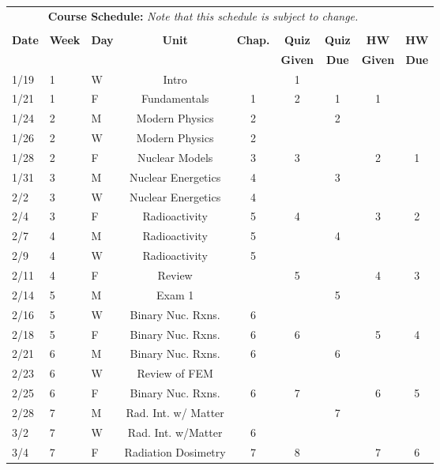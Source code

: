 \documentclass[11pt, a4paper]{article}
\begin{document}
\pagebreak
\FloatBarrier
\renewcommand{\arraystretch}{1}
\begin{table}[h]
\begin{center}
\begin{tabular}{lllcccccc}
\multicolumn{8}{c}{\textbf{Course Schedule:}\textit{ Note that this schedule is
subject to change.}}\\
&&&&&&&&\\
\textbf{Date} & \textbf{Week} & \textbf{Day} & \textbf{Unit} & \textbf{Chap.} & \textbf{Quiz}& \textbf{Quiz} & \textbf{HW} & \textbf{HW}\\
              &  &  &  &  & \textbf{Given} & \textbf{Due} & \textbf{Given} & \textbf{Due}\\ \hline
\hline
1/19 & 1 & W & Intro              &  & 1 &  &  & \\
1/21 & 1 & F & Fundamentals       & 1 & 2 & 1 & 1 &  \\
1/24 & 2 & M & Modern Physics     & 2 &   & 2 & &  \\
1/26 & 2 & W & Modern Physics     & 2 &   &  &  &  \\
1/28 & 2 & F & Nuclear Models     & 3 & 3 &  & 2 & 1  \\
1/31 & 3 & M & Nuclear Energetics & 4 &   & 3 & &  \\
2/2 & 3 & W & Nuclear Energetics  & 4 &   &  &  &  \\
2/4 & 3 & F & Radioactivity       & 5 & 4 &  & 3 & 2 \\
2/7 & 4 & M & Radioactivity       & 5 &   & 4 &  &  \\
2/9 & 4 & W & Radioactivity       & 5 &   &  &  &  \\
2/11 & 4 & F & Review             &   & 5 &  & 4 & 3 \\
2/14 & 5 & M & Exam 1             &   &   & 5  &  &  \\
2/16 & 5 & W & Binary Nuc. Rxns.  & 6 &   &  &  &  \\
2/18 & 5 & F & Binary Nuc. Rxns.  & 6 & 6 &  & 5 & 4 \\
2/21 & 6 & M & Binary Nuc. Rxns.  & 6 &   & 6 &  &  \\
2/23 & 6 & W & Review of FEM      &  &  &  &  &  \\
2/25 & 6 & F & Binary Nuc. Rxns.  & 6 & 7 &  & 6 & 5  \\
2/28 & 7 & M & Rad. Int. w/ Matter &  &  & 7 &  &  \\
3/2 & 7 & W & Rad. Int. w/Matter  & 6 &  &  &  &  \\
3/4 & 7 & F & Radiation Dosimetry  & 7 & 8 &  & 7 & 6 \\

\end{tabular}
\end{center}
\end{table}
\end{document}
